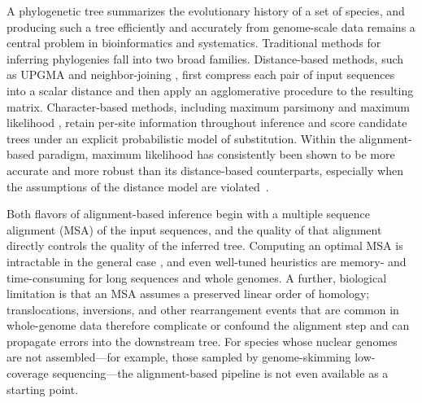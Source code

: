 \documentclass[11pt]{article}
\begin{document}
A phylogenetic tree summarizes the evolutionary history of a set of species,
and producing such a tree efficiently and accurately from genome-scale data
remains a central problem in bioinformatics and systematics. Traditional
methods for inferring phylogenies fall into two broad families. Distance-based
methods, such as UPGMA \citep{sokal1958upgma} and neighbor-joining
\citep{saitou1987nj}, first compress each pair of input sequences into a
scalar distance and then apply an agglomerative procedure to the resulting
matrix. Character-based methods, including maximum parsimony
\citep{fitch1971parsimony} and maximum likelihood
\citep{felsenstein1981ml, posada2021felsenstein}, retain per-site information
throughout inference and score candidate trees under an explicit probabilistic
model of substitution. Within the alignment-based paradigm, maximum likelihood
has consistently been shown to be more accurate and more robust than its
distance-based counterparts, especially when the assumptions of the distance
model are violated~\citep{felsenstein1981ml, posada2021felsenstein}.

Both flavors of alignment-based inference begin with a multiple sequence
alignment (MSA) of the input sequences, and the quality of that alignment
directly controls the quality of the inferred tree. Computing an optimal MSA
is intractable in the general case \citep{elias2006msa}, and even well-tuned
heuristics are memory- and time-consuming for long sequences and whole
genomes. A further, biological limitation is that an MSA assumes a preserved
linear order of homology; translocations, inversions, and other rearrangement
events that are common in whole-genome data therefore complicate or confound
the alignment step and can propagate errors into the downstream tree. For
species whose nuclear genomes are not assembled---for example, those sampled
by genome-skimming low-coverage sequencing---the alignment-based pipeline is
not even available as a starting point.
\end{document}
